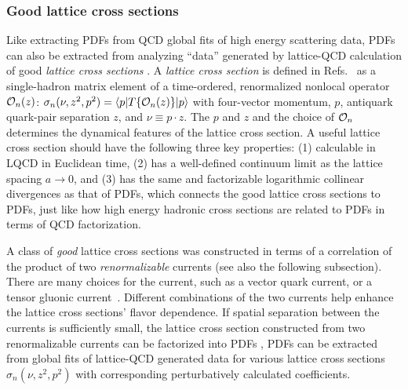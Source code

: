 \subsubsection{Good lattice cross sections}
Like extracting PDFs from QCD global fits of high energy scattering data, PDFs can also be extracted from analyzing ``data'' generated by lattice-QCD calculation of good {\it lattice cross sections} \cite{Ma:2014jla,Ma:2014jga}. A {\it lattice cross section} is defined in Refs.~\cite{ Ma:2014jla,Ma:2014jga} as a single-hadron matrix element of a time-ordered, renormalized nonlocal operator ${\cal O}_n(z)$: ${\sigma}_{n}(\nu,z^2,p^2)=\langle p| {T}\{{\cal O}_n({z})\}|p\rangle$ with four-vector momentum, $p$, antiquark quark-pair separation $z$, and $\nu\equiv p\cdot z$. The $p$ and $z$ and the choice of ${\cal O}_n$ determines the dynamical features of the lattice cross section. A useful lattice cross section should have the following three key properties: (1) calculable in LQCD in Euclidean time, (2) has a well-defined continuum limit as the lattice spacing $a\to 0$, and (3) has the same and factorizable logarithmic collinear divergences as that of PDFs, which connects the good lattice cross sections to PDFs, just like how high energy hadronic cross sections are related to PDFs in terms of QCD factorization.  

A class of {\it good} lattice cross sections was constructed in terms of a correlation of the product of two {\it renormalizable} currents (see also the following subsection).  There are many choices for the current, such as a vector quark current, or a tensor gluonic current~\cite{Ma:2017pxb}.  Different combinations of the two currents help enhance the lattice cross sections' flavor dependence.  If spatial separation between the currents is sufficiently small, the lattice cross section constructed from two renormalizable currents can be factorized into PDFs \cite{Ma:2017pxb},
PDFs can be extracted from global fits of lattice-QCD generated data for various lattice cross sections $\sigma_{n}(\nu,z^2,p^2)$ with corresponding perturbatively calculated coefficients.

